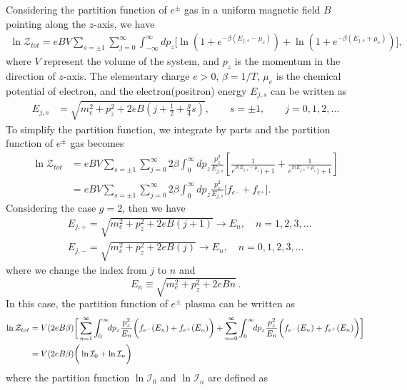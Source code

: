 \documentclass[sn-mathphys,Numbered]{sn-jnl}
\begin{document}
Considering the partition function of $e^\pm$ gas in a uniform magnetic field $B$ pointing along the $z$-axis, we have
\begin{align}
\ln\mathcal{Z}_{tot}=eBV\!\!\sum_{s=\pm1}\sum_{j=0}^\infty\int^\infty_{-\infty} \!\!dp_z\bigg[\ln\left(1+e^{-\beta(E_{j,s}-\mu_e)}\right)+\ln\left(1+e^{-\beta(E_{j,s}+\mu_e)}\right)\bigg],
\end{align}
where $V$ represent the volume of the system, and $p_z$ is the momentum in the direction of $z$-axis. The elementary charge $e>0$, $\beta=1/T$, $\mu_e$ is the chemical potential of electron, and the electron(positron) energy $E_{j,s}$ can be written as
\begin{align}
E_{j,s}&=\sqrt{m^2_e+p^2_z+2eB\left(j+\frac{1}{2}+\frac{g}{4}s\right)},\qquad s=\pm1,\qquad j=0,1,2,\dots
\end{align}
To simplify the partition function, we integrate by parts and the partition function of $e^\pm$ gas becomes
\begin{align}
\ln\mathcal{Z}_{tot}&=eBV\sum_{s=\pm1}\sum_{j=0}^\infty2\beta\int_0^\infty\!\!dp_z \frac{p_z^2}{E_{j,s}}\left[\frac{1}{e^{\beta(E_{j,s}-\mu_e})+1}+\frac{1}{e^{\beta(E_{j,s}+\mu_e})+1}\right]\\
&=eBV\sum_{s=\pm1}\sum_{j=0}^\infty2\beta\int_0^\infty\!\!dp_z \frac{p_z^2}{E_{j,s}}\bigg[f_{e^-}+f_{e^+}\bigg].
\end{align}
Considering the case $g=2$, then we have
\begin{align}
&E_{j,+}=\sqrt{{m}_e^2+p^2_z+2eB\left(j+1\right)}\longrightarrow E_{n},\quad n=1,2,3,\dots\\
&E_{j,-}=\sqrt{{m}_e^2+p^2_z+2eB\left(j\right)}\longrightarrow E_{n},\quad n=0,1,2,3,\dots
\end{align}
where we change the index from $j$ to $n$ and
\begin{equation}\label{eq:En}
    E_n \equiv \sqrt{{m}_e^2+p^2_z+2eBn}\,.
\end{equation}
In this case, the partition function of $e^\pm$ plasma can be written as
\begin{align}
\ln\mathcal{Z}_{tot}&=V(2eB\beta) \bigg[ \sum_{n=1}^\infty\int_0^\infty\!\!dp_z \frac{p_z^2}{E_{n}}\bigg(f_{e^-}(E_n)+f_{e^+}(E_n)\bigg)+\sum_{n=0}^\infty\int_0^\infty\!\!dp_z \frac{p_z^2}{E_{n}}\bigg(f_{e^-}(E_n)+f_{e^+}(E_n)\bigg)\bigg]\notag\\
&=V(2eB\beta)\bigg(\ln\mathcal{I}_{0}+\ln\mathcal{I}_{n}\bigg)
\end{align}
where the partition function $\ln\mathcal{I}_{0}$ and $\ln\mathcal{I}_{n}$ are defined as
\end{document}
